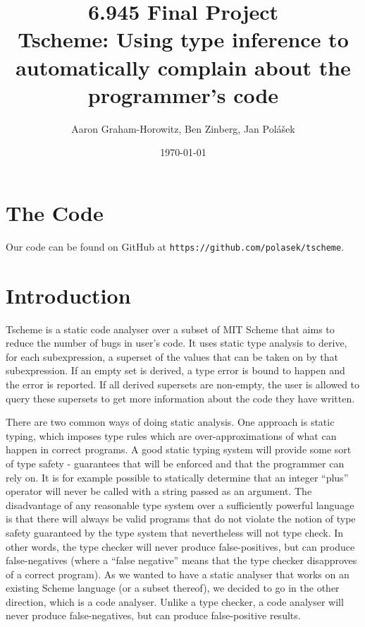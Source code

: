 \documentclass[a4paper]{article}
\newcommand{\T}[1]{\texttt{#1}}
\begin{document}
\title{6.945 Final Project\\
Tscheme: Using type inference to automatically complain about the programmer's code}
\date{\today}
\author{Aaron Graham-Horowitz, Ben Zinberg, Jan Polášek}
\maketitle

\newpage

\setcounter{section}{-1}
\section{The Code}
Our code can be found on GitHub at \T{https://github.com/polasek/tscheme}.

\section{Introduction}

Tscheme is a static code analyser over a subset of MIT Scheme that aims to
reduce the number of bugs in user's code.  It uses static type analysis to
derive, for each subexpression, a superset of the values that can be taken on by
that subexpression.
If an empty set is derived, a type error is bound to happen and the error is
reported.  If all derived supersets are non-empty, the user is allowed to query
these supersets to get more information about the code they have written.

There are two common ways of doing static analysis.
One approach is static typing, which imposes type rules which are
over-approximations of what can happen in correct programs.
A good static typing system will provide some sort of type safety -
guarantees that will be enforced and that the programmer can rely on.
It is for example possible to statically determine that an integer ``plus''
operator will never be called with a string passed as an argument.
The disadvantage of any reasonable type system over a sufficiently powerful language
is that there will always be valid programs that do not violate the notion of
type safety guaranteed by the type system that nevertheless will not type check.
In other words, the type checker will never produce false-positives,
but can produce false-negatives (where a ``false negative'' means that the type
checker disapproves of a correct program).
As we wanted to have a static analyser that works on an existing Scheme
language (or a subset thereof), we decided to go in the other direction,
which is a code analyser.
Unlike a type checker, a code analyser will never produce false-negatives,
but can produce false-positive results.
\end{document}
